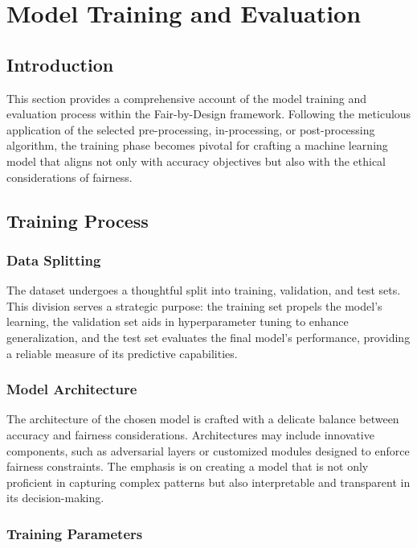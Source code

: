 \documentclass[12pt,a4paper,openright,twoside]{book}
\begin{document}
\section{Model Training and Evaluation}
\label{section:model-training}

\subsection{Introduction}

This section provides a comprehensive account of the model training and evaluation process within the Fair-by-Design framework. Following the meticulous application of the selected pre-processing, in-processing, or post-processing algorithm, the training phase becomes pivotal for crafting a machine learning model that aligns not only with accuracy objectives but also with the ethical considerations of fairness.

\subsection{Training Process}

\subsubsection{Data Splitting}

The dataset undergoes a thoughtful split into training, validation, and test sets. This division serves a strategic purpose: the training set propels the model's learning, the validation set aids in hyperparameter tuning to enhance generalization, and the test set evaluates the final model's performance, providing a reliable measure of its predictive capabilities.

\subsubsection{Model Architecture}

The architecture of the chosen model is crafted with a delicate balance between accuracy and fairness considerations. Architectures may include innovative components, such as adversarial layers or customized modules designed to enforce fairness constraints. The emphasis is on creating a model that is not only proficient in capturing complex patterns but also interpretable and transparent in its decision-making.

\subsubsection{Training Parameters}
\end{document}
